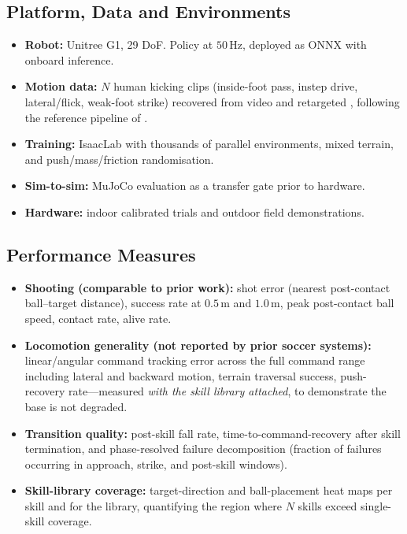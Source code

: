 \documentclass{article}
\begin{document}
\subsection{Platform, Data and Environments}
\begin{itemize}
  \item \textbf{Robot:} Unitree G1, 29 DoF. Policy at $50$\,Hz, deployed as ONNX with onboard inference.
  \item \textbf{Motion data:} $N$ human kicking clips (inside-foot pass, instep drive, lateral/flick, weak-foot strike) recovered from video \citep{gvhmr} and retargeted \citep{gmr}, following the reference pipeline of \citep{robonaldo,beyondmimic}.
  \item \textbf{Training:} IsaacLab \citep{isaaclab} with thousands of parallel environments, mixed terrain, and push/mass/friction randomisation.
  \item \textbf{Sim-to-sim:} MuJoCo evaluation as a transfer gate prior to hardware.
  \item \textbf{Hardware:} indoor calibrated trials and outdoor field demonstrations.
\end{itemize}

\subsection{Performance Measures}
\begin{itemize}
  \item \textbf{Shooting (comparable to prior work):} shot error (nearest post-contact ball--target distance), success rate at $0.5$\,m and $1.0$\,m, peak post-contact ball speed, contact rate, alive rate.
  \item \textbf{Locomotion generality (not reported by prior soccer systems):} linear/angular command tracking error across the full command range including lateral and backward motion, terrain traversal success, push-recovery rate---measured \emph{with the skill library attached}, to demonstrate the base is not degraded.
  \item \textbf{Transition quality:} post-skill fall rate, time-to-command-recovery after skill termination, and phase-resolved failure decomposition (fraction of failures occurring in approach, strike, and post-skill windows).
  \item \textbf{Skill-library coverage:} target-direction and ball-placement heat maps per skill and for the library, quantifying the region where $N$ skills exceed single-skill coverage.
\end{itemize}
\end{document}
